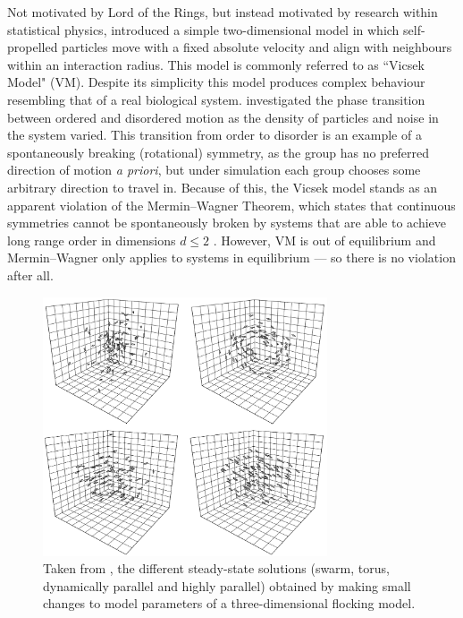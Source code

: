 Not motivated by Lord of the Rings, but instead motivated by research within statistical physics, 
\textcite{vicsek95} introduced a simple two-dimensional model in which self-propelled particles move 
with a fixed absolute velocity and align with neighbours within an interaction radius. This model is 
commonly referred to as ``Vicsek Model" (VM). Despite its simplicity this model produces complex 
behaviour resembling that of a real biological system. \textcite{vicsek95} investigated the phase 
transition between ordered and disordered motion as the density of particles and noise in the system 
varied. This transition from order to disorder is an example of a spontaneously breaking (rotational) 
symmetry, as the group has no preferred direction of motion \emph{a priori}, but under simulation 
each group chooses some arbitrary direction to travel in. Because of this, the Vicsek model stands as 
an apparent violation of the Mermin--Wagner Theorem, which states that continuous symmetries cannot 
be spontaneously broken by systems that are able to achieve long range order in dimensions $d\leq 2$ 
\parencite{mermin66}. However, VM is out of equilibrium and Mermin--Wagner only applies to systems in 
equilibrium --- so there is no violation after all.

\begin{figure}[t]
	\includegraphics[width=0.75\textwidth]{couzin.png}
	\caption{Taken from \textcite{couzin02}, the different steady-state solutions (swarm, torus, 
dynamically parallel and highly parallel) obtained by making small changes to model parameters of a 
three-dimensional flocking model.}
	\label{fig:couzin}
\end{figure}

